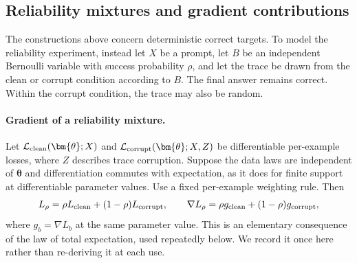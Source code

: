 \subsection{Reliability mixtures and gradient contributions}
\label{app:mixture-proof}

The constructions above concern deterministic correct targets.  To model the
reliability experiment, instead let $X$ be a prompt, let $B$ be an independent
Bernoulli variable with success probability $\rho$, and let the trace be drawn
from the clean or corrupt condition according to $B$.  The final answer remains
correct.  Within the corrupt condition, the trace may also be random.

\paragraph{Gradient of a reliability mixture.}
Let $\mathcal L_{\rm clean}(\bm{\theta};X)$ and
$\mathcal L_{\rm corrupt}(\bm{\theta};X,Z)$ be differentiable per-example losses,
where $Z$ describes trace corruption.  Suppose the data laws are independent of
$\bm{\theta}$ and differentiation commutes with expectation, as it does for finite
support at differentiable parameter values.  Use a fixed per-example weighting
rule.  Then
\begin{equation}
 L_\rho=\rho L_{\rm clean}+(1-\rho)L_{\rm corrupt},\qquad
 \nabla L_\rho=\rho g_{\rm clean}+(1-\rho)g_{\rm corrupt},
 \label{eq:mixture-gradient}
\end{equation}
where $g_b=\nabla L_b$ at the same parameter value. This is an elementary
consequence of the law of total expectation, used repeatedly below. We
record it once here rather than re-deriving it at each use.


